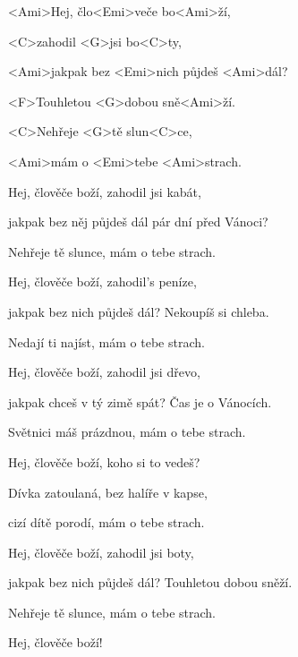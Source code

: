 

\zs
<Ami>Hej, člo<Emi>veče bo<Ami>ží,

<C>zahodil <G>jsi bo<C>ty,

<Ami>jakpak bez <Emi>nich půjdeš <Ami>dál?

<F>Touhletou <G>dobou sně<Ami>ží.

<C>Nehřeje <G>tě slun<C>ce,

<Ami>mám o <Emi>tebe <Ami>strach.
\ks

\zs
Hej, člověče boží, zahodil jsi kabát,

jakpak bez něj půjdeš dál pár dní před Vánoci?

Nehřeje tě slunce, mám o tebe strach.
\ks

\zs
Hej, člověče boží, zahodil's peníze,

jakpak bez nich půjdeš dál? Nekoupíš si chleba.

Nedají ti najíst, mám o tebe strach.
\ks

\zs
Hej, člověče boží, zahodil jsi dřevo,

jakpak chceš v tý zimě spát? Čas je o Vánocích.

Světnici máš prázdnou, mám o tebe strach.
\ks

\zs
Hej, člověče boží, koho si to vedeš?

Dívka zatoulaná, bez halíře v kapse,

cizí dítě porodí, mám o tebe strach.
\ks

\zs
Hej, člověče boží, zahodil jsi boty,

jakpak bez nich půjdeš dál? Touhletou dobou sněží.

Nehřeje tě slunce, mám o tebe strach.
\ks

Hej, člověče boží!

\kp
